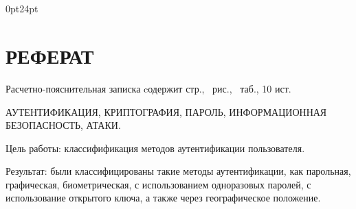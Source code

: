 \titlespacing\section{\parindent}{0pt}{24pt}
\section*{\hfill{\centering РЕФЕРАТ}\hfill}

Расчетно-пояснительная записка cодержит \pageref{LastPage} стр., \totalfigures\ рис., \totaltables\ таб., 10 ист.

АУТЕНТИФИКАЦИЯ, КРИПТОГРАФИЯ, ПАРОЛЬ, ИНФОРМАЦИОННАЯ БЕЗОПАСНОСТЬ, АТАКИ.

Цель работы: классифификация методов аутентификации пользователя.

Результат: были классифицированы такие методы аутентификации, как парольная, графическая, биометрическая, с использованием одноразовых паролей, с использование открытого ключа, а также через географическое положение.
